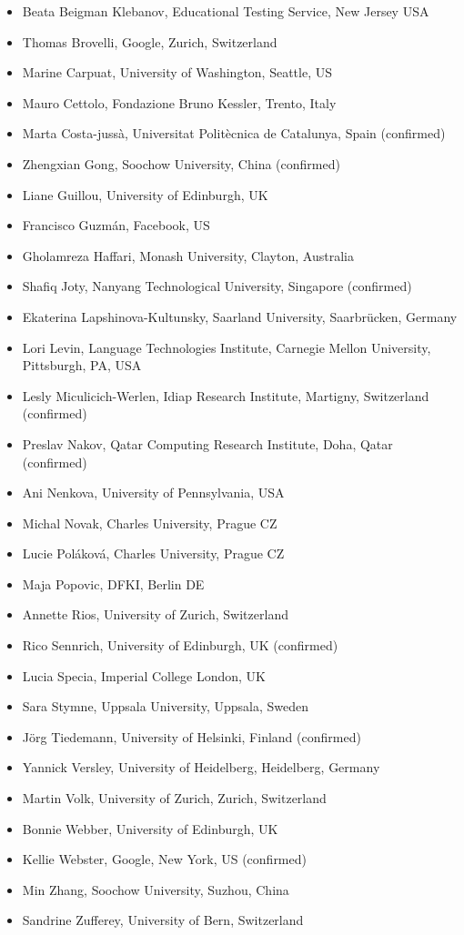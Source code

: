 \documentclass[11pt]{article}
\begin{document}
\begin{itemize}
\item Beata Beigman Klebanov, Educational Testing Service, New Jersey USA
\item Thomas Brovelli, Google, Zurich, Switzerland
\item Marine Carpuat, University of Washington, Seattle, US
\item Mauro Cettolo, Fondazione Bruno Kessler, Trento, Italy
\item Marta Costa-jussà, Universitat Politècnica de Catalunya, Spain (confirmed)
\item Zhengxian Gong, Soochow University, China (confirmed)
\item Liane Guillou, University of Edinburgh, UK
\item Francisco Guzm\'{a}n, Facebook, US
\item Gholamreza Haffari, Monash University, Clayton, Australia
\item Shafiq Joty, Nanyang Technological University, Singapore (confirmed)
\item Ekaterina Lapshinova-Kultunsky, Saarland University, Saarbrücken, Germany 
\item Lori Levin, Language Technologies Institute, Carnegie Mellon University, Pittsburgh, PA, USA
\item Lesly Miculicich-Werlen, Idiap Research Institute, Martigny, Switzerland (confirmed)
\item Preslav Nakov, Qatar Computing Research Institute, Doha, Qatar (confirmed)
\item Ani Nenkova, University of Pennsylvania, USA
\item Michal Novak, Charles University, Prague CZ
\item Lucie Pol\'{a}kov\'{a}, Charles University, Prague CZ
\item Maja Popovic, DFKI, Berlin DE
\item Annette Rios, University of Zurich, Switzerland
\item Rico Sennrich, University of Edinburgh, UK (confirmed)
\item Lucia Specia, Imperial College London, UK
\item Sara Stymne, Uppsala University, Uppsala, Sweden
\item Jörg Tiedemann, University of Helsinki, Finland (confirmed)
\item Yannick Versley, University of Heidelberg, Heidelberg, Germany
\item Martin Volk, University of Zurich, Zurich, Switzerland
\item Bonnie Webber, University of Edinburgh, UK
\item Kellie Webster, Google, New York, US (confirmed)
\item Min Zhang, Soochow University, Suzhou, China
\item Sandrine Zufferey, University of Bern, Switzerland
\end{itemize}
\end{document}
